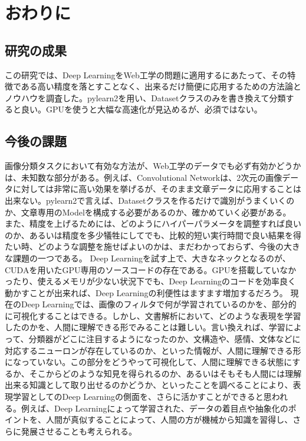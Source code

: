 \chapter{おわりに}
\section{研究の成果}
この研究では、Deep LearningをWeb工学の問題に適用するにあたって、その特徴である高い精度を落とすことなく、出来るだけ簡便に応用するための方法論とノウハウを調査した。pylearn2を用い、Datasetクラスのみを書き換えて分類すると良い。GPUを使うと大幅な高速化が見込めるが、必須ではない。
\section{今後の課題}
画像分類タスクにおいて有効な方法が、Web工学のデータでも必ず有効かどうかは、未知数な部分がある。例えば、Convolutional Networkは、2次元の画像データに対しては非常に高い効果を挙げるが、そのまま文章データに応用することは出来ない。pylearn2で言えば、Datasetクラスを作るだけで識別がうまくいくのか、文章専用のModelを構成する必要があるのか、確かめていく必要がある。
また、精度を上げるためには、どのようにハイパーパラメータを調整すれば良いのか、あるいは精度を多少犠牲にしてでも、比較的短い実行時間で良い結果を得たい時、どのような調整を施せばよいのかは、まだわかっておらず、今後の大きな課題の一つである。
Deep Learningを試す上で、大きなネックとなるのが、CUDAを用いたGPU専用のソースコードの存在である。GPUを搭載していなかったり、使えるメモリが少ない状況下でも、Deep Learningのコードを効率良く動かすことが出来れば、Deep Learningの利便性はますます増加するだろう。
現在のDeep Learningでは、画像のフィルタで何が学習されているのかを、部分的に可視化することはできる。しかし、文書解析において、どのような表現を学習したのかを、人間に理解できる形でみることは難しい。言い換えれば、学習によって、分類器がどこに注目するようになったのか、文構造や、感情、文体などに対応するニューロンが存在しているのか、といった情報が、人間に理解できる形になっていない。この部分をどうやって可視化して、人間に理解できる状態にするか、そこからどのような知見を得られるのか、あるいはそもそも人間には理解出来る知識として取り出せるのかどうか、といったことを調べることにより、表現学習としてのDeep Learningの側面を、さらに活かすことができると思われる。例えば、Deep Learningにょって学習された、データの着目点や抽象化のポイントを、人間が真似することによって、人間の方が機械から知識を習得し、さらに発展させることも考えられる。
